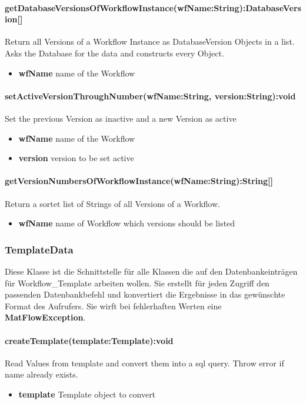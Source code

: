 \paragraph{getDatabaseVersionsOfWorkflowInstance(wfName:String):DatabaseVersion[]}
 Return all Versions of a Workflow Instance as DatabaseVersion Objects in a list.
 Asks the Database for the data and constructs every Object.
\begin{itemize}
	\item \textbf{wfName}
	name of the Workflow
\end{itemize}

\paragraph{setActiveVersionThroughNumber(wfName:String, version:String):void}
Set the previous Version as inactive and a new Version as active
\begin{itemize}
	\item \textbf{wfName}
	name of the Workflow
	\item \textbf{version}
	version to be set active
\end{itemize}

\paragraph{getVersionNumbersOfWorkflowInstance(wfName:String):String[]}
Return a sortet list of Strings of all Versions of a Workflow.
\begin{itemize}
	\item \textbf{wfName}
	name of Workflow which versions should be listed
\end{itemize}



\subsubsection{TemplateData}
Diese Klasse ist die Schnittstelle für alle Klassen die auf den Datenbankeinträgen für Workflow\_Template arbeiten wollen. Sie erstellt für jeden Zugriff den passenden Datenbankbefehl und konvertiert die Ergebnisse in das gewünschte Format des Aufrufers.
Sie wirft bei fehlerhaften Werten eine \textbf{MatFlowException}.

\paragraph{createTemplate(template:Template):void}
Read Values from template and convert them into a sql query.
Throw error if name already exists.
\begin{itemize}
	\item \textbf{template}
	Template object to convert
\end{itemize}

